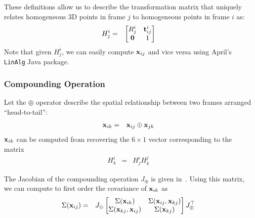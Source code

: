 \documentclass[conference]{IEEEtran}
\begin{document}
These definitions allow us to describe the transformation matrix
that uniquely relates homogeneous 3D points in frame $j$ to homogeneous
points in frame $i$ as:
\begin{eqnarray*}
  H_{j}^i & = & \begin{bmatrix}
    R_j^i & {\bf t}_{ij}^i\\
    {\bf 0} & 1
  \end{bmatrix}
\end{eqnarray*}
Note that given $H_j^i$, we can easily compute ${\bf x}_{ij}$ and vice
versa using April's \texttt{LinAlg} Java package.

\subsubsection{Compounding Operation}
\label{sub:compoundingoperation}

Let the $\oplus$ operator describe the spatial relationship between
two frames arranged ``head-to-tail'':
\begin{eqnarray*}
  {\bf x}_{ik} & = & {\bf x}_{ij} \oplus {\bf x}_{jk} 
\end{eqnarray*}
${\bf x}_{ik}$ can be computed from recovering the $6 \times 1$ vector
corresponding to the matrix
\begin{eqnarray*}
  H_k^i & = & H_j^i H_k^j
\end{eqnarray*}


The Jacobian of the compounding operation $J_\oplus$ is given
in~\cite{reustice-phdthesis}.  Using this matrix, we can compute to
first order the covariance of ${\bf x}_{ik}$ as
\begin{eqnarray*}
  \Sigma({\bf x}_{ij}) & = & J_\oplus \begin{bmatrix}
    \Sigma({\bf x}_{ik}) & \Sigma({\bf x}_{ij}, {\bf x}_{kj})\\
    \Sigma({\bf x}_{kj}, {\bf x}_{ij}) & \Sigma({\bf x}_{kj})\\
  \end{bmatrix} J_\oplus^\top
\end{eqnarray*}
\end{document}

